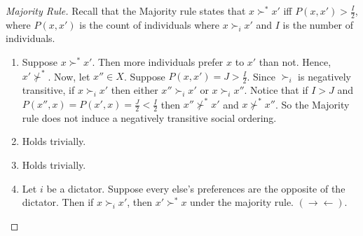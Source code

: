 \documentclass[12pt]{article}
\theoremstyle{definition}
\theoremstyle{remark}
\def\contra{\rightarrow \leftarrow}
\begin{document}
\begin{proof}[Majority Rule]
  Recall that the Majority rule states that $x \succ^* x'$ iff $P(x, x') > \frac{I}{2}$, where $P(x, x')$ is the count of individuals where $x \succ_i x'$ and $I$ is the number of individuals.
  \begin{enumerate}
    \item Suppose $x \succ^* x'$. Then more individuals prefer $x$ to $x'$ than not. Hence, $x' \not\succ^*$. Now, let $x'' \in X$. Suppose $P(x, x') = J > \frac{I}{2}$. Since $\succ_i$ is negatively transitive, if $x \succ_i x'$ then either $x'' \succ_i x'$ or $x \succ_i x''$.
    Notice that if $I > J$ and $P(x'', x) = P(x', x) = \frac{J}{2} < \frac{I}{2}$ then $x'' \not\succ^* x'$ and $x \not\succ^* x''$. So the Majority rule does not induce a negatively transitive social ordering.
    \item Holds trivially.
    \item Holds trivially.
    \item Let $i$ be a dictator. Suppose every else's preferences are the opposite of the dictator. Then if $x \succ_i x'$, then $x' \succ^* x$ under the majority rule. $(\contra)$.
  \end{enumerate}
\end{proof}
\end{document}
